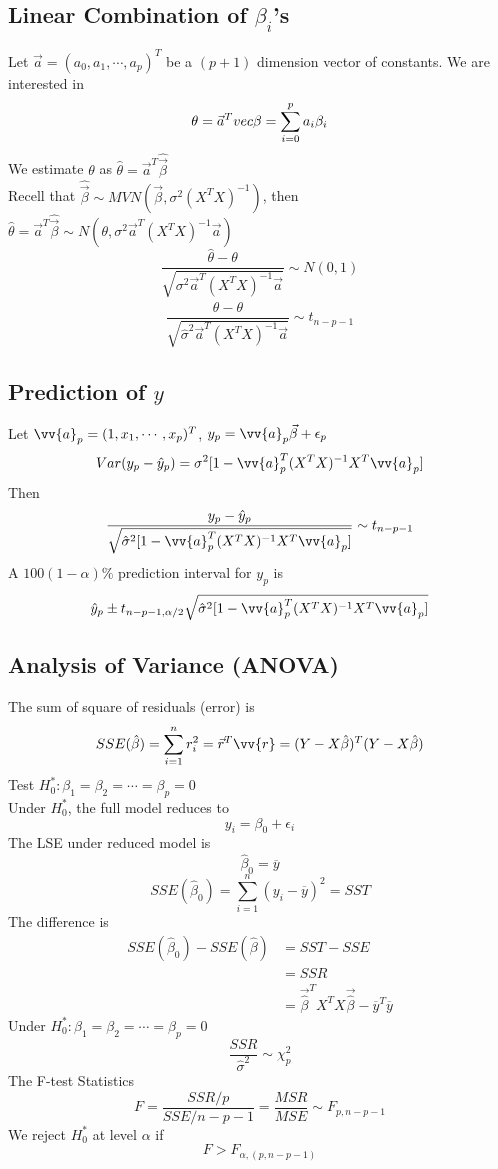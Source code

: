 \documentclass[11pt]{article}
\newcommand{\va}{\vv{a}}
\newcommand{\vr}{\vv{r}}
\begin{document}
\subsection{Linear Combination of $\beta_i$'s}
Let $\vec{a}=(a_0,a_1,\cdots,a_p)^T$ be a $(p+1)$ dimension vector of constants. We are interested in 
\[\theta=\vec{a}^T\\vec{\beta}=\sum_{i=0}^{p}a_i\beta_i\]
We estimate $\theta$ as $\hat{\theta}=\vec{a}^T\hat{\vec{\beta}}$ \\
Recell that $\hat{\vec{\beta}}\sim MVN(\vec{\beta}, \sigma^2(X^TX)^{-1})$, then $\hat{\theta}=\vec{a}^T\hat{\vec{\beta}}\sim N(\theta, \sigma^2\vec{a}^T(X^TX)^{-1}\vec{a})$
\[\frac{\hat{\theta}-\theta}{\sqrt{\sigma^2\vec{a}^T(X^TX)^{-1}\vec{a}}}\sim N(0,1)\]
\[\frac{\hat{\theta}-\theta}{\sqrt{\hat{\sigma}^2\vec{a}^T(X^TX)^{-1}\vec{a}}}\sim t_{n-p-1}\]
\subsection{Prediction of $y$}
Let $\va_p = (1,x_1,\cdots,x_p)^T$, $y_p=\va_p\vec{\beta}+\epsilon_p$
\[Var(y_p-\hat{y}_p)=\sigma^2[1-\va_p^T(X^TX)^{-1}X^T\va_p]\]
Then 
\[\frac{y_p-\hat{y}_p}{\sqrt{\hat{\sigma}^2[1-\va_p^T(X^TX)^{-1}X^T\va_p]}}\sim t_{n-p-1}\]
A $100(1-\alpha)\%$ prediction interval for $y_p$ is
\[\hat{y}_p\pm t_{n-p-1,\alpha/2}\sqrt{\hat{\sigma}^2[1-\va_p^T(X^TX)^{-1}X^T\va_p]}\]
\subsection{Analysis of Variance (ANOVA)}
The sum of square of residuals (error) is 
\[SSE(\hat{\beta})=\sum_{i=1}^{n}r_i^2=\vec{r}^T\vr = (Y-X\hat{\beta})^T(Y-X\hat{\beta})\]
Test $H_0^*:\beta_1=\beta_2=\cdots=\beta_p=0$ \\
Under $H_0^*$, the full model reduces to \[y_i=\beta_0+\epsilon_i\]
The LSE under reduced model is \[\hat{\beta}_0=\overline{y}\]
\[SSE(\hat{\beta}_0) = \sum_{i=1}^{n}(y_i-\overline{y})^2 = SST\]
The difference is 
\begin{align*}
    SSE(\hat{\beta}_0) - SSE(\hat{\beta}) &= SST - SSE \\
    &= SSR \\
    &= \vec{\hat{\beta}}^TX^TX\vec{\hat{\beta}}-\overline{y}^T\overline{y}
\end{align*}
Under $H_0^*: \beta_1=\beta_2=\cdots=\beta_p=0$
\[\frac{SSR}{\hat{\sigma}^2}\sim \chi^2_p\]
The F-test Statistics
\[F=\frac{SSR/p}{SSE/n-p-1} = \frac{MSR}{MSE} \sim F_{p,n-p-1}\]
We reject $H_0^*$ at level $\alpha$ if 
\[F>F_{\alpha,(p,n-p-1)}\]
\end{document}
